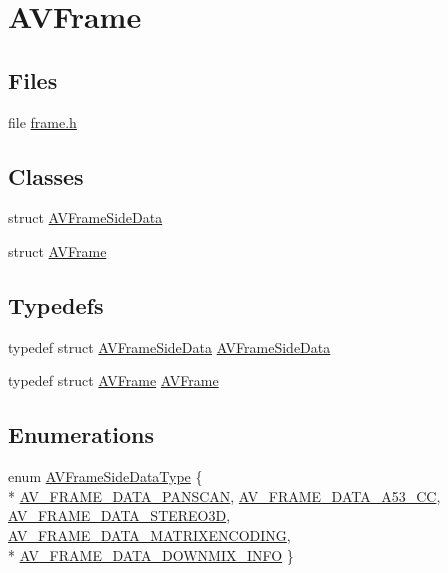 \hypertarget{group__lavu__frame}{}\section{A\+V\+Frame}
\label{group__lavu__frame}
\subsection*{Files}
\begin{DoxyCompactItemize}
\item 
file \hyperlink{ffmpeg_2libavutil_2frame_8h}{frame.\+h}
\end{DoxyCompactItemize}
\subsection*{Classes}
\begin{DoxyCompactItemize}
\item 
struct \hyperlink{struct_a_v_frame_side_data}{A\+V\+Frame\+Side\+Data}
\item 
struct \hyperlink{struct_a_v_frame}{A\+V\+Frame}
\end{DoxyCompactItemize}
\subsection*{Typedefs}
\begin{DoxyCompactItemize}
\item 
typedef struct \hyperlink{struct_a_v_frame_side_data}{A\+V\+Frame\+Side\+Data} \hyperlink{group__lavu__frame_gacd0daf404bac7e57b287feb110cc2ae6}{A\+V\+Frame\+Side\+Data}
\item 
typedef struct \hyperlink{struct_a_v_frame}{A\+V\+Frame} \hyperlink{group__lavu__frame_gac2c5a41a89d6c9cfeb3bd87af9f98502}{A\+V\+Frame}
\end{DoxyCompactItemize}
\subsection*{Enumerations}
\begin{DoxyCompactItemize}
\item 
enum \hyperlink{group__lavu__frame_gae01fa7e427274293aacdf2adc17076bc}{A\+V\+Frame\+Side\+Data\+Type} \{ \\*
\hyperlink{group__lavu__frame_ggae01fa7e427274293aacdf2adc17076bca3de91a03b453c956b7274a2392d9a437}{A\+V\+\_\+\+F\+R\+A\+M\+E\+\_\+\+D\+A\+T\+A\+\_\+\+P\+A\+N\+S\+C\+AN}, 
\hyperlink{group__lavu__frame_ggae01fa7e427274293aacdf2adc17076bca4848fd3952b4c2e1c1b85acb628c78a6}{A\+V\+\_\+\+F\+R\+A\+M\+E\+\_\+\+D\+A\+T\+A\+\_\+\+A53\+\_\+\+CC}, 
\hyperlink{group__lavu__frame_ggae01fa7e427274293aacdf2adc17076bcacec681d6146e8bd4c61b2e1cc88354a8}{A\+V\+\_\+\+F\+R\+A\+M\+E\+\_\+\+D\+A\+T\+A\+\_\+\+S\+T\+E\+R\+E\+O3D}, 
\hyperlink{group__lavu__frame_ggae01fa7e427274293aacdf2adc17076bcaa69ea5c11a5431bfff9e565714dafe41}{A\+V\+\_\+\+F\+R\+A\+M\+E\+\_\+\+D\+A\+T\+A\+\_\+\+M\+A\+T\+R\+I\+X\+E\+N\+C\+O\+D\+I\+NG}, 
\\*
\hyperlink{group__lavu__frame_ggae01fa7e427274293aacdf2adc17076bca71819257ea0bedb7e0740a0ce60e404a}{A\+V\+\_\+\+F\+R\+A\+M\+E\+\_\+\+D\+A\+T\+A\+\_\+\+D\+O\+W\+N\+M\+I\+X\+\_\+\+I\+N\+FO}
 \}
\end{DoxyCompactItemize}
